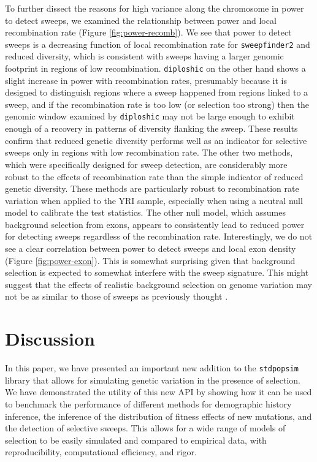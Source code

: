 \documentclass[hidelinks]{article}
\newcommand{\stdpopsim}{\texttt{stdpopsim}\xspace}
\newcommand{\sweepfinder}{\texttt{sweepfinder2}\xspace}
\newcommand{\diploshic}{\texttt{diploshic}\xspace}
\begin{document}
    To further dissect the reasons for high variance along the chromosome in power to detect sweeps,
    we examined the relationship between power and local recombination rate (Figure \ref{fig:power-recomb}).
    We see that power to detect sweeps is
    a decreasing function of local recombination rate for \sweepfinder and reduced diversity,
    which is consistent with sweeps having a larger genomic footprint in regions of low
    recombination.
    \diploshic on the other hand shows a slight increase in power with recombination rates,
    presumably because it is designed to distinguish regions where a sweep happened from regions linked to a sweep,
    and if the recombination rate is too low (or selection too strong) then the genomic window examined by \diploshic may
    not be large enough to exhibit enough of a recovery in patterns of diversity flanking the sweep.
    These results confirm that reduced genetic diversity performs well as an indicator for selective sweeps only in regions with
    low recombination rate.
    The other two methods, which were specifically designed for sweep detection, are considerably more robust 
    to the effects of recombination rate than the simple indicator of reduced genetic diversity.
    These methods are particularly robust to recombination rate variation when applied to 
    the YRI sample, especially when using a neutral null model to calibrate the test statistics.
    The other null model, which assumes background selection from exons,
    appears to consistently lead to reduced power for detecting sweeps regardless of the recombination rate.
    Interestingly, we do not see a clear correlation between power to detect sweeps and
    local exon density (Figure \ref{fig:power-exon}).
    This is somewhat surprising given that background selection is expected to somewhat interfere with the sweep signature.
    This might suggest that the effects of realistic background selection on genome variation
    may not be as similar to those of sweeps as previously thought \citep{schrider2020background}.

\section*{Discussion}
    \label{Discussion}
    In this paper, we have presented an important new addition to the \stdpopsim{} library
    that allows for simulating genetic variation in the presence of selection.
    We have demonstrated the utility of this new API by showing how it can be used to benchmark
    the performance of different methods for demographic history inference, the inference of the distribution
    of fitness effects of new mutations, and the detection of selective sweeps.
    This allows for a wide range of models of selection to be easily simulated and compared to
    empirical data, with reproducibility, computational efficiency, and rigor.
\end{document}
